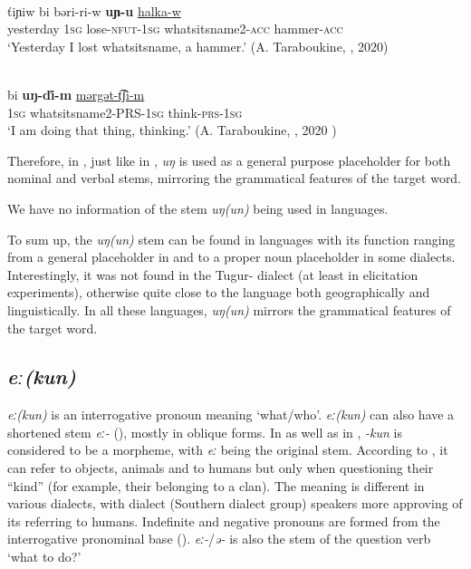 \documentclass[output=paper,colorlinks,citecolor=brown]{langscibook}
\begin{document}
\ea
    \label{example6.42}
    \\
    \gll ťiɲiw	bi	bəri-ri-w	\textbf{uɲ-u}	\uline{halka-w}\\
    yesterday	1\textsc{sg}	lose-\textsc{nfut}-1\textsc{sg}	whatsitsname2-\textsc{acc}	hammer-\textsc{acc}\\
    \glt `Yesterday I lost whatsitsname, a hammer.' (A. Taraboukine, , 2020)\\
    \z

	\ea
    \label{example6.43}
    \\
    \gll bi	\textbf{uŋ-ďi-m}	\uline{mərgət-t͡ʃi-m}\\
    1\textsc{sg}	whatsitsname2-PRS-1\textsc{sg}	think-\textsc{prs}-1\textsc{sg}\\
    \glt `I am doing that thing, thinking.' (A. Taraboukine, , 2020 )\\
    \z

Therefore, in , just like in , \textit{uŋ} is used as a general purpose placeholder for both nominal and verbal stems, mirroring the grammatical features of the target word.

We have no information of the stem \textit{uŋ(un)} being used in  languages.

To sum up, the \textit{uŋ(un)} stem can be found in  languages with its function ranging from a general placeholder in  and  to a proper noun placeholder in some  dialects. Interestingly, it was not found in the Tugur- dialect (at least in elicitation experiments), otherwise quite close to the  language both geographically and linguistically. In all these languages, \textit{uŋ(un)} mirrors the grammatical features of the target word.


\subsection{\textit{eː(kun)}}

\textit{eː(kun)} is an interrogative pronoun meaning ‘what/who’. \textit{eː(kun)} can also have a shortened stem \textit{eː-} (\citealt[137]{Konstantinova1964}), mostly in oblique forms. In \citet{Poppe1977} as well as in \citet[I: 286]{Cincius1975K}, \textit{-kun} is considered to be a morpheme, with \textit{eː} being the original stem. According to \citet[303--308]{Idiatov2007}, it can refer to objects, animals and to humans but only when questioning their “kind” (for example, their belonging to a clan). The meaning is different in various dialects, with  dialect (Southern dialect group) speakers more approving of its referring to humans. Indefinite and negative pronouns are formed from the interrogative pronominal base (\citealt[25]{BulatovaGrenoble1999}). \textit{eː-}/\textit{ə-} is also the stem of the question verb ‘what to do?’
\end{document}
